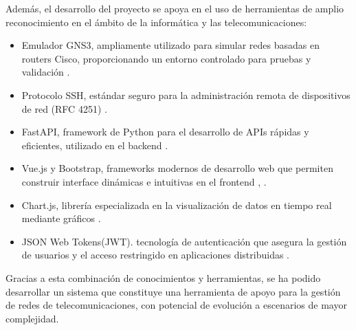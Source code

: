 Además, el desarrollo del proyecto se apoya en el uso de herramientas de amplio reconocimiento en el ámbito de la informática y las telecomunicaciones:

\begin{itemize}
    \item Emulador GNS3, ampliamente utilizado para simular redes basadas en routers Cisco, proporcionando un entorno controlado para pruebas y validación \citep{GNS3}.
    \item Protocolo SSH, estándar seguro para la administración remota de dispositivos de red (RFC 4251) \citep{SSH}.
    \item FastAPI, framework de Python para el desarrollo de APIs rápidas y eficientes, utilizado en el backend \citep{FastAPI}.
    \item Vue.js y Bootstrap, frameworks modernos de desarrollo web que permiten construir interface dinámicas e intuitivas en el frontend \citep{Vue}, \citep{Bootstrap}.
    \item Chart.js, librería especializada en la visualización de datos en tiempo real mediante gráficos \citep{ChartJS}.
    \item JSON Web Tokens(JWT). tecnología de autenticación que asegura la gestión de usuarios y el acceso restringido en aplicaciones distribuidas \citep{JWT}.
\end{itemize}

Gracias a esta combinación de conocimientos y herramientas, se ha podido desarrollar un sistema que constituye una herramienta de apoyo para la gestión de redes de telecomunicaciones, con potencial de evolución a escenarios de mayor complejidad.

